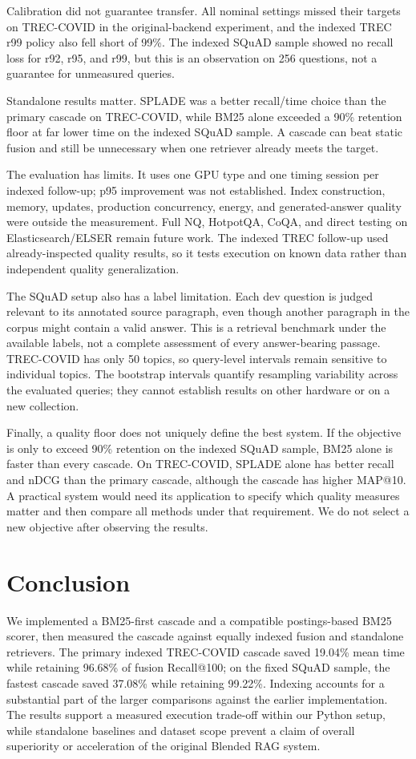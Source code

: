 \documentclass[conference]{IEEEtran}
\begin{document}
Calibration did not guarantee transfer. All nominal settings missed their targets on TREC-COVID in the original-backend experiment, and the indexed TREC r99 policy also fell short of 99\%. The indexed SQuAD sample showed no recall loss for r92, r95, and r99, but this is an observation on 256 questions, not a guarantee for unmeasured queries.

Standalone results matter. SPLADE was a better recall/time choice than the primary cascade on TREC-COVID, while BM25 alone exceeded a 90\% retention floor at far lower time on the indexed SQuAD sample. A cascade can beat static fusion and still be unnecessary when one retriever already meets the target.

The evaluation has limits. It uses one GPU type and one timing session per indexed follow-up; p95 improvement was not established. Index construction, memory, updates, production concurrency, energy, and generated-answer quality were outside the measurement. Full NQ, HotpotQA, CoQA, and direct testing on Elasticsearch/ELSER remain future work. The indexed TREC follow-up used already-inspected quality results, so it tests execution on known data rather than independent quality generalization.

The SQuAD setup also has a label limitation. Each dev question is judged relevant to its annotated source paragraph, even though another paragraph in the corpus might contain a valid answer. This is a retrieval benchmark under the available labels, not a complete assessment of every answer-bearing passage. TREC-COVID has only 50 topics, so query-level intervals remain sensitive to individual topics. The bootstrap intervals quantify resampling variability across the evaluated queries; they cannot establish results on other hardware or on a new collection.

Finally, a quality floor does not uniquely define the best system. If the objective is only to exceed 90\% retention on the indexed SQuAD sample, BM25 alone is faster than every cascade. On TREC-COVID, SPLADE alone has better recall and nDCG than the primary cascade, although the cascade has higher MAP@10. A practical system would need its application to specify which quality measures matter and then compare all methods under that requirement. We do not select a new objective after observing the results.

\section{Conclusion}
We implemented a BM25-first cascade and a compatible postings-based BM25 scorer, then measured the cascade against equally indexed fusion and standalone retrievers. The primary indexed TREC-COVID cascade saved 19.04\% mean time while retaining 96.68\% of fusion Recall@100; on the fixed SQuAD sample, the fastest cascade saved 37.08\% while retaining 99.22\%. Indexing accounts for a substantial part of the larger comparisons against the earlier implementation. The results support a measured execution trade-off within our Python setup, while standalone baselines and dataset scope prevent a claim of overall superiority or acceleration of the original Blended RAG system.
\end{document}
